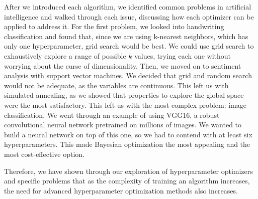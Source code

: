 \documentclass[stu,12pt,floatsintext]{apa7}
\begin{document}
After we introduced each algorithm, we identified common problems in artificial intelligence and walked through each issue, discussing how each optimizer can be applied to address it. For the first problem, we looked into handwriting classification and found that, since we are using k-nearest neighbors, which has only one hyperparameter, grid search would be best. We could use grid search to exhaustively explore a range of possible \(k\) values, trying each one without worrying about the curse of dimensionality. Then, we moved on to sentiment analysis with support vector machines. We decided that grid and random search would not be adequate, as the variables are continuous. This left us with simulated annealing, as we showed that properties to explore the global space were the most satisfactory. This left us with the most complex problem: image classification. We went through an example of using VGG16, a robust convolutional neural network pretrained on millions of images. We wanted to build a neural network on top of this one, so we had to contend with at least six hyperparameters. This made Bayesian optimization the most appealing and the most cost-effective option. 

Therefore, we have shown through our exploration of hyperparameter optimizers and specific problems that as the complexity of training an algorithm increases, the need for advanced hyperparameter optimization methods also increases.

\printbibliography
\end{document}
